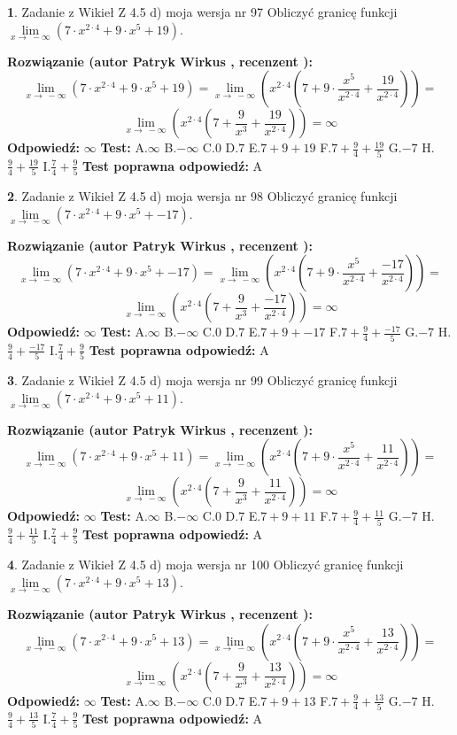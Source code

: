 \documentclass[12pt, a4paper]{article}
\theoremstyle{definition} %
\newtheorem{zad}{}
\newcommand{\zadStart}[1]{\begin{zad}#1\newline}
\newcommand{\zadStop}{\end{zad}}
\newcommand{\rozwStart}[2]{\noindent \textbf{Rozwiązanie (autor #1 , recenzent #2): }\newline}
\newcommand{\rozwStop}{\newline}
\newcommand{\odpStart}{\noindent \textbf{Odpowiedź:}\newline}
\newcommand{\odpStop}{\newline}
\newcommand{\testStart}{\noindent \textbf{Test:}\newline}
\newcommand{\testStop}{\newline}
\newcommand{\kluczStart}{\noindent \textbf{Test poprawna odpowiedź:}\newline}
\newcommand{\kluczStop}{\newline}
\begin{document}
\zadStart{Zadanie z Wikieł Z 4.5 d) moja wersja nr 97}
Obliczyć granicę funkcji  $\lim\limits_{x\to\ -\infty}(7 \cdot x^{2\cdot4}+9 \cdot x^{5}+19)$.
\zadStop
\rozwStart{Patryk Wirkus}{}
$$\lim\limits_{x\to\ -\infty}(7 \cdot x^{2\cdot4}+9 \cdot x^{5}+19) = \lim\limits_{x\to\ -\infty}(x^{2\cdot4}(7 +9 \cdot \frac{x^{5}}{x^{2\cdot4}}+\frac{19}{x^{2\cdot4}})) =$$ $$\lim\limits_{x\to\ -\infty}(x^{2\cdot4}(7 +\frac{9}{x^{3}}+\frac{19}{x^{2\cdot4}})) =\infty$$
\rozwStop
\odpStart
$\infty$
\odpStop
\testStart
A.$\infty$ B.$-\infty$ C.$0$ D.$7$ E.$7 + 9 + 19$
F.$7+\frac{9}{4}+\frac{19}{5}$ G.$-7$
H.$\frac{9}{4}+\frac{19}{5}$
I.$\frac{7}{4}+\frac{9}{5}$
\testStop
\kluczStart
A
\kluczStop



\zadStart{Zadanie z Wikieł Z 4.5 d) moja wersja nr 98}
Obliczyć granicę funkcji  $\lim\limits_{x\to\ -\infty}(7 \cdot x^{2\cdot4}+9 \cdot x^{5}+-17)$.
\zadStop
\rozwStart{Patryk Wirkus}{}
$$\lim\limits_{x\to\ -\infty}(7 \cdot x^{2\cdot4}+9 \cdot x^{5}+-17) = \lim\limits_{x\to\ -\infty}(x^{2\cdot4}(7 +9 \cdot \frac{x^{5}}{x^{2\cdot4}}+\frac{-17}{x^{2\cdot4}})) =$$ $$\lim\limits_{x\to\ -\infty}(x^{2\cdot4}(7 +\frac{9}{x^{3}}+\frac{-17}{x^{2\cdot4}})) =\infty$$
\rozwStop
\odpStart
$\infty$
\odpStop
\testStart
A.$\infty$ B.$-\infty$ C.$0$ D.$7$ E.$7 + 9 + -17$
F.$7+\frac{9}{4}+\frac{-17}{5}$ G.$-7$
H.$\frac{9}{4}+\frac{-17}{5}$
I.$\frac{7}{4}+\frac{9}{5}$
\testStop
\kluczStart
A
\kluczStop



\zadStart{Zadanie z Wikieł Z 4.5 d) moja wersja nr 99}
Obliczyć granicę funkcji  $\lim\limits_{x\to\ -\infty}(7 \cdot x^{2\cdot4}+9 \cdot x^{5}+11)$.
\zadStop
\rozwStart{Patryk Wirkus}{}
$$\lim\limits_{x\to\ -\infty}(7 \cdot x^{2\cdot4}+9 \cdot x^{5}+11) = \lim\limits_{x\to\ -\infty}(x^{2\cdot4}(7 +9 \cdot \frac{x^{5}}{x^{2\cdot4}}+\frac{11}{x^{2\cdot4}})) =$$ $$\lim\limits_{x\to\ -\infty}(x^{2\cdot4}(7 +\frac{9}{x^{3}}+\frac{11}{x^{2\cdot4}})) =\infty$$
\rozwStop
\odpStart
$\infty$
\odpStop
\testStart
A.$\infty$ B.$-\infty$ C.$0$ D.$7$ E.$7 + 9 + 11$
F.$7+\frac{9}{4}+\frac{11}{5}$ G.$-7$
H.$\frac{9}{4}+\frac{11}{5}$
I.$\frac{7}{4}+\frac{9}{5}$
\testStop
\kluczStart
A
\kluczStop



\zadStart{Zadanie z Wikieł Z 4.5 d) moja wersja nr 100}
Obliczyć granicę funkcji  $\lim\limits_{x\to\ -\infty}(7 \cdot x^{2\cdot4}+9 \cdot x^{5}+13)$.
\zadStop
\rozwStart{Patryk Wirkus}{}
$$\lim\limits_{x\to\ -\infty}(7 \cdot x^{2\cdot4}+9 \cdot x^{5}+13) = \lim\limits_{x\to\ -\infty}(x^{2\cdot4}(7 +9 \cdot \frac{x^{5}}{x^{2\cdot4}}+\frac{13}{x^{2\cdot4}})) =$$ $$\lim\limits_{x\to\ -\infty}(x^{2\cdot4}(7 +\frac{9}{x^{3}}+\frac{13}{x^{2\cdot4}})) =\infty$$
\rozwStop
\odpStart
$\infty$
\odpStop
\testStart
A.$\infty$ B.$-\infty$ C.$0$ D.$7$ E.$7 + 9 + 13$
F.$7+\frac{9}{4}+\frac{13}{5}$ G.$-7$
H.$\frac{9}{4}+\frac{13}{5}$
I.$\frac{7}{4}+\frac{9}{5}$
\testStop
\kluczStart
A
\kluczStop
\end{document}
